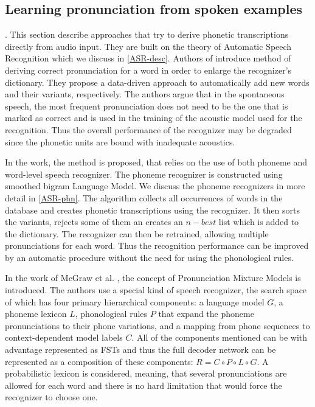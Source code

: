 \subsection{Learning pronunciation from spoken examples}.
\label{pronunc-spoken}
This section describe approaches that try to derive phonetic transcriptions directly from audio input.
They are built on the theory of Automatic Speech Recognition which we discuss in \ref{ASR-desc}.
Authors of \cite{slobada1996dictionary} introduce method of deriving correct pronunciation for a word in order to enlarge the recognizer's dictionary.
They propose a data-driven approach to automatically add new words and their variants, respectively.
The authors argue that in the spontaneous speech, the most frequent pronunciation does not need to be the one that is marked as correct and is used in the training of the acoustic model used for the recognition.
Thus the overall performance of the recognizer may be degraded since the phonetic units are bound with inadequate acoustics.
\par
In the work, the method is proposed, that relies on the use of both phoneme and word-level speech recognizer.
The phoneme recognizer is constructed using smoothed bigram Language Model.
We discuss the phoneme recognizers in more detail in \ref{ASR-phn}.
The algorithm collects all occurrences of words in the database and creates phonetic transcriptions using the recognizer.
It then sorts the variants, rejects some of them an creates an $n-best$ list which is added to the dictionary.
The recognizer can then be retrained, allowing multiple pronunciations for each word.
Thus the recognition performance can be improved by an automatic procedure without the need for using the phonological rules.
\par
In the work of McGraw et al. \cite{mcgraw2013learning}, the concept of Pronunciation Mixture Models is introduced.
The authors use a special kind of speech recognizer, the search space of which has four primary hierarchical components: a language model $G$, a phoneme lexicon $L$, phonological rules $P$ that expand the phoneme pronunciations to their phone variations, and a mapping from phone sequences to context-dependent model labels
$C$.
All of the components mentioned can be with advantage represented as FSTs and thus the full decoder network can be represented as a composition of these components: $R = C\circ P \circ L \circ G$.
A probabilistic lexicon is considered, meaning, that several pronunciations are allowed for each word and there is no hard limitation that would force the recognizer to choose one.

